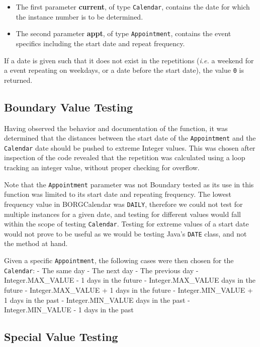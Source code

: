 \begin{itemize}
\tightlist
\item
  The first parameter \textbf{current}, of type \lstinline!Calendar!,
  contains the date for which the instance number is to be determined.
\item
  The second parameter \textbf{appt}, of type \lstinline!Appointment!,
  contains the event specifics including the start date and repeat
  frequency.
\end{itemize}

If a date is given such that it does not exist in the repetitions
(\emph{i.e.} a weekend for a event repeating on weekdays, or a date
before the start date), the value \lstinline!0! is returned.

\subsection{Boundary Value Testing}\label{boundary-value-testing}

Having observed the behavior and documentation of the function, it was
determined that the distances between the start date of the
\lstinline!Appointment! and the \lstinline!Calendar! date should be
pushed to extreme Integer values. This was chosen after inspection of
the code revealed that the repetition was calculated using a loop
tracking an integer value, without proper checking for overflow.

Note that the \lstinline!Appointment! parameter was not Boundary tested
as its use in this function was limited to its start date and repeating
frequency. The lowest frequency value in BORGCalendar was
\lstinline!DAILY!, therefore we could not test for multiple instances
for a given date, and testing for different values would fall within the
scope of testing \lstinline!Calendar!. Testing for extreme values of a
start date would not prove to be useful as we would be testing Java's
\lstinline!DATE! class, and not the method at hand.

Given a specific \lstinline!Appointment!, the following cases were then
chosen for the \lstinline!Calendar!: - The same day - The next day - The
previous day - Integer.MAX\_VALUE - 1 days in the future -
Integer.MAX\_VALUE days in the future - Integer.MAX\_VALUE + 1 days in
the future - Integer.MIN\_VALUE + 1 days in the past -
Integer.MIN\_VALUE days in the past - Integer.MIN\_VALUE - 1 days in the
past

\subsection{Special Value Testing}\label{special-value-testing}

